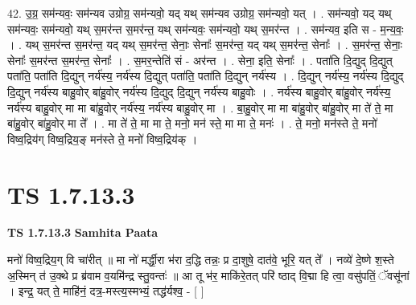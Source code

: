 \documentclass[17pt]{extarticle}
\begin{document}
42. उ॒ग्र॒ सम॑न्यवः॒ सम॑न्यव उग्रोग्र॒ सम॑न्यवो॒ यद् यथ् सम॑न्यव उग्रोग्र॒ सम॑न्यवो॒ यत् । . सम॑न्यवो॒ यद् यथ् सम॑न्यवः॒ सम॑न्यवो॒ यथ् स॒मर॑न्त स॒मर॑न्त॒ यथ् सम॑न्यवः॒ सम॑न्यवो॒ यथ् स॒मर॑न्त । . सम॑न्यव॒ इति स - म॒न्य॒वः॒ । . यथ् स॒मर॑न्त स॒मर॑न्त॒ यद् यथ् स॒मर॑न्त॒ सेनाः॒ सेनाः᳚ स॒मर॑न्त॒ यद् यथ् स॒मर॑न्त॒ सेनाः᳚ । . स॒मर॑न्त॒ सेनाः॒ सेनाः᳚ स॒मर॑न्त स॒मर॑न्त॒ सेनाः᳚ । . स॒मर॒न्तेति॑ सं - अर॑न्त । . सेना॒ इति॒ सेनाः᳚ । . पता॑ति दि॒द्युद् दि॒द्युत् पता॑ति॒ पता॑ति दि॒द्युन् नर्य॑स्य॒ नर्य॑स्य दि॒द्युत् पता॑ति॒ पता॑ति दि॒द्युन् नर्य॑स्य । . दि॒द्युन् नर्य॑स्य॒ नर्य॑स्य दि॒द्युद् दि॒द्युन् नर्य॑स्य बाहु॒वोर् बा॑हु॒वोर् नर्य॑स्य दि॒द्युद् दि॒द्युन् नर्य॑स्य बाहु॒वोः । . नर्य॑स्य बाहु॒वोर् बा॑हु॒वोर् नर्य॑स्य॒ नर्य॑स्य बाहु॒वोर् मा मा बा॑हु॒वोर् नर्य॑स्य॒ नर्य॑स्य बाहु॒वोर् मा । . बा॒हु॒वोर् मा मा बा॑हु॒वोर् बा॑हु॒वोर् मा ते॑ ते॒ मा बा॑हु॒वोर् बा॑हु॒वोर् मा ते᳚ । . मा ते॑ ते॒ मा मा ते॒ मनो॒ मन॑ स्ते॒ मा मा ते॒ मनः॑ । . ते॒ मनो॒ मन॑स्ते ते॒ मनो॑ विष्व॒द्रिय॑ग् विष्व॒द्रिय॒ङ् मन॑स्ते ते॒ मनो॑ विष्व॒द्रिय॑क् । \newline
\pagebreak
{}
\section*{ TS 1.7.13.3 }

\textbf{TS 1.7.13.3 } \newline
\textbf{Samhita Paata} \newline

मनो॑ विष्व॒द्रिय॒ग् वि चा॑रीत् ॥ मा नो॑ मर्द्धी॒रा भ॑रा द॒द्धि तन्नः॒ प्र दा॒शुषे॒ दात॑वे॒ भूरि॒ यत् ते᳚ । नव्ये॑ दे॒ष्णे श॒स्ते अ॒स्मिन् त॑ उ॒क्थे प्र ब्र॑वाम व॒यमि॑न्द्र स्तु॒वन्तः॑ ॥ आ तू भ॑र॒ माकि॑रे॒तत् परि॑ ष्ठाद् वि॒द्मा हि त्वा॒ वसु॑पतिं॒ ॅवसू॑नां । इन्द्र॒ यत् ते॒ माहि॑नं॒ दत्र॒-मस्त्य॒स्मभ्यं॒ तद्ध॑र्यश्व॒ - [ ] \newline
\end{document}
